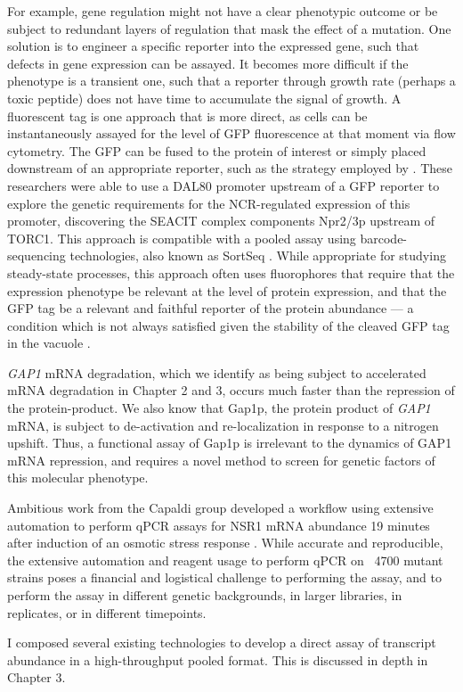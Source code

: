 For example, gene regulation might not have a
clear phenotypic outcome or be subject to redundant layers of
regulation that mask the effect of a mutation. One solution is to
engineer a specific reporter into the expressed gene, such that
defects in gene expression can be assayed. It becomes more difficult
if the phenotype is a transient one, such that a reporter through
growth rate (perhaps a toxic peptide) does not have time to accumulate
the signal of growth. A fluorescent tag is one approach that is more
direct, as cells can be instantaneously assayed for the
level of GFP fluorescence at that moment via flow cytometry. The GFP
can be fused to the protein of interest or simply placed downstream of
an appropriate reporter, such as the strategy employed by 
\cite{neklesa2009genome}. 
These researchers were able to use a DAL80 promoter upstream of a GFP
reporter to explore the genetic requirements for the NCR-regulated
expression of this promoter, discovering the SEACIT complex components
Npr2/3p upstream of TORC1. 
This approach is compatible with a pooled assay using
barcode-sequencing technologies, also known as SortSeq
\parencite{kinney2010using,oikonomou2014systematic,peterman2016sort,de2017deciphering}.
While appropriate for studying steady-state processes, this approach
often uses fluorophores that require that the
expression phenotype be relevant at the level of protein expression,
and that the GFP tag be a relevant and faithful reporter of
the protein abundance --- a condition which is not always satisfied 
given the stability of the cleaved GFP tag in the vacuole
\parencite{conibear2002studying}.

\textit{GAP1} mRNA degradation, which we identify as
being subject to accelerated mRNA degradation in Chapter 2 and 3,
occurs much faster than the repression of the protein-product. We also
know that Gap1p, the protein product of \textit{GAP1} mRNA, is subject to
de-activation and re-localization in response to a nitrogen upshift.
Thus, a functional assay of Gap1p is irrelevant to the dynamics of
GAP1 mRNA repression, and requires a novel method to screen for
genetic factors of this molecular phenotype.  

Ambitious work from the
Capaldi group developed a workflow using extensive automation to
perform qPCR assays for NSR1 mRNA abundance 19 minutes after induction
of an osmotic stress response 
\parencite{worley2016genome}. While accurate and
reproducible, the extensive automation and reagent usage to perform
qPCR on ~4700 mutant strains poses a financial and logistical
challenge to performing the assay, and to perform the assay in
different genetic backgrounds, in larger libraries, in replicates, or
in different timepoints.  

I composed several existing technologies
\parencite{hanley2013detection} to
develop a direct assay of transcript abundance in a high-throughput
pooled format. This is discussed in depth in Chapter 3. 

